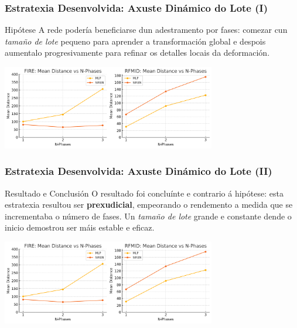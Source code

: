 \documentclass[xcolor=dvipsnames]{beamer}
\begin{document}
\begin{frame}
    \frametitle{Estratexia Desenvolvida: Axuste Dinámico do Lote (I)}
    
    \begin{block}{Hipótese}
        A rede podería beneficiarse dun adestramento por fases: comezar cun \textit{tamaño de lote} pequeno para aprender a transformación global e despois aumentalo progresivamente para refinar os detalles locais da deformación.
    \end{block}
        \vspace{0.5cm}

    \centering
    \includegraphics[width=0.7\textwidth]{../imaxes/lottery/nphases.png}
    
\end{frame}

\begin{frame}
    \frametitle{Estratexia Desenvolvida: Axuste Dinámico do Lote (II)}
        \begin{alertblock}{Resultado e Conclusión}
        O resultado foi concluínte e contrario á hipótese: esta estratexia resultou ser \textbf{prexudicial}, empeorando o rendemento a medida que se incrementaba o número de fases. Un \textit{tamaño de lote} grande e constante dende o inicio demostrou ser máis estable e eficaz.
    \end{alertblock}
    \vspace{0.5cm}
    \centering
    \includegraphics[width=0.7\textwidth]{../imaxes/lottery/nphases.png}
    


\end{frame}
\end{document}
